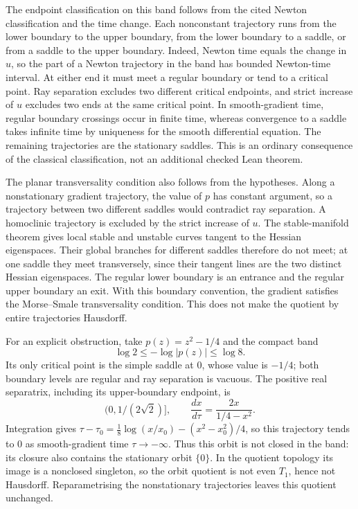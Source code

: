 The endpoint classification on this band follows from the cited Newton
classification and the time change. Each nonconstant trajectory runs
from the lower boundary to the upper boundary, from the lower boundary
to a saddle, or from a saddle to the upper boundary. Indeed, Newton time
equals the change in $u$, so the part of a Newton trajectory in the
band has bounded Newton-time interval. At either end it must meet a
regular boundary or tend to a critical point. Ray separation excludes
two different critical endpoints, and strict increase of $u$ excludes
two ends at the same critical point. In smooth-gradient time, regular
boundary crossings occur in finite time, whereas convergence to a
saddle takes infinite time by uniqueness for the smooth differential
equation. The remaining trajectories are the stationary saddles.
This is an ordinary consequence of the classical classification, not
an additional checked Lean theorem.

The planar transversality condition also follows from the hypotheses.
Along a nonstationary gradient trajectory, the value of $p$ has constant
argument, so a trajectory between two different saddles would contradict
ray separation. A homoclinic trajectory is excluded
by the strict increase of $u$. The stable-manifold theorem gives local
stable and unstable curves tangent to the Hessian eigenspaces. Their
global branches for different saddles therefore do not meet; at one
saddle they meet transversely,
since their tangent lines are the two distinct Hessian eigenspaces.
The regular lower boundary is an entrance and the regular upper boundary
an exit. With this boundary convention, the gradient satisfies the
Morse--Smale transversality condition. This does not make the quotient
by entire trajectories Hausdorff.

For an explicit obstruction, take $p(z)=z^2-1/4$ and the compact band
\[
 \log2\le-\log|p(z)|\le\log8.
\]
Its only critical point is the simple saddle at $0$, whose value is
$-1/4$; both boundary levels are regular and ray separation is vacuous.
The positive real separatrix, including its upper-boundary endpoint, is
\[
 \bigl(0,1/(2\sqrt2)\bigr],\qquad
 \frac{dx}{d\tau}=\frac{2x}{1/4-x^2}.
\]
Integration gives
$\tau-\tau_0=\tfrac18\log(x/x_0)-(x^2-x_0^2)/4$, so this
trajectory tends to $0$ as smooth-gradient time $\tau\to-\infty$.
Thus this orbit is not closed in the band: its closure also contains the
stationary orbit $\{0\}$. In the quotient topology its image is a
nonclosed singleton, so the orbit quotient is not even $T_1$, hence not
Hausdorff. Reparametrising the nonstationary trajectories leaves this
quotient unchanged.

